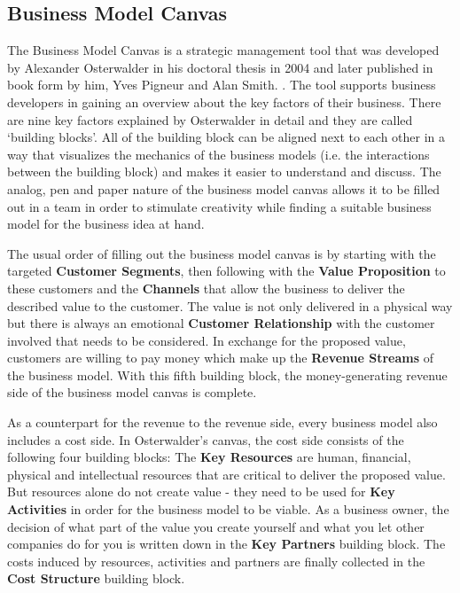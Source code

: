 	\subsection{Business Model Canvas} 
	\label{sec:bmc}
		The Business Model Canvas is a strategic management tool that was developed by Alexander Osterwalder in his doctoral thesis in 2004 and later published in book form by him, Yves Pigneur and Alan Smith. \cite{osterwalder}. The tool supports business developers in gaining an overview about the key factors of their business. There are nine key factors explained by Osterwalder in detail and they are called `building blocks'. All of the building block can be aligned next to each other in a way that visualizes the mechanics of the business models (i.e. the interactions between the building block) and makes it easier to understand and discuss. The analog, pen and paper nature of the business model canvas allows it to be filled out in a team in order to stimulate creativity while finding a suitable business model for the business idea at hand.

		The usual order of filling out the business model canvas \cite[video]{bmc} is by starting with the targeted \textbf{Customer Segments}, then following with the \textbf{Value Proposition} to these customers and the \textbf{Channels} that allow the business to deliver the described value to the customer. The value is not only delivered in a physical way but there is always an emotional \textbf{Customer Relationship} with the customer involved that needs to be considered. In exchange for the proposed value, customers are willing to pay money which make up the \textbf{Revenue Streams} of the business model. With this fifth building block, the money-generating revenue side of the business model canvas is complete.

		As a counterpart for the revenue to the revenue side, every business model also includes a cost side. In Osterwalder's canvas, the cost side consists of the following four building blocks: The \textbf{Key Resources} are human, financial, physical and intellectual resources that are critical to deliver the proposed value. But resources alone do not create value - they need to be used for \textbf{Key Activities} in order for the business model to be viable. As a business owner, the decision of what part of the value you create yourself and what you let other companies do for you is written down in the \textbf{Key Partners} building block. The costs induced by resources, activities and partners are finally collected in the \textbf{Cost Structure} building block.

